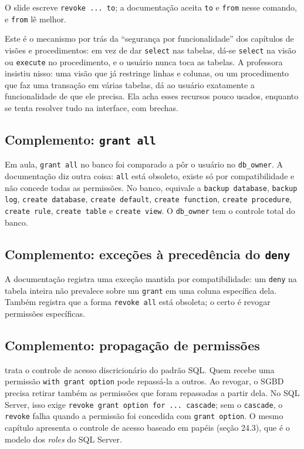 O slide escreve \texttt{revoke ... to}; a documentação aceita
\texttt{to} e \texttt{from} nesse comando, e
\texttt{from} lê melhor.

Este é o mecanismo por trás da ``segurança por funcionalidade'' dos
capítulos de visões e procedimentos: em vez de dar \texttt{select} nas
tabelas, dá-se \texttt{select} na visão ou \texttt{execute} no
procedimento, e o usuário nunca toca as tabelas. A professora insistiu
nisso: uma visão que já restringe linhas e colunas, ou um procedimento
que faz uma transação em várias tabelas, dá ao usuário exatamente a
funcionalidade de que ele precisa. Ela acha esses recursos pouco usados,
enquanto se tenta resolver tudo na interface, com brechas.

\subsection*{Complemento: \texttt{grant all}}

Em aula, \texttt{grant all} no banco foi comparado a pôr o usuário no
\texttt{db\_owner}. A documentação diz outra coisa: \texttt{all} está
obsoleto, existe só por compatibilidade e não concede todas as
permissões. No banco, equivale a \texttt{backup database},
\texttt{backup log}, \texttt{create database}, \texttt{create default},
\texttt{create function}, \texttt{create procedure}, \texttt{create
rule}, \texttt{create table} e \texttt{create view}.
O \texttt{db\_owner} tem o controle total do banco.

\subsection*{Complemento: exceções à precedência do \texttt{deny}}

A documentação registra uma exceção mantida por compatibilidade: um
\texttt{deny} na tabela inteira não prevalece sobre um \texttt{grant} em
uma coluna específica dela. Também registra que a
forma \texttt{revoke all} está obsoleta; o certo é revogar permissões
específicas.

\subsection*{Complemento: propagação de permissões}

\textcite[seção 24.2]{Elmasri2011} trata o controle de acesso
discricionário do padrão SQL. Quem recebe uma permissão \texttt{with
grant option} pode repassá-la a outros. Ao revogar, o SGBD precisa
retirar também as permissões que foram repassadas a partir dela. No SQL
Server, isso exige \texttt{revoke grant option for ... cascade}; sem o
\texttt{cascade}, o \texttt{revoke} falha quando a permissão foi
concedida com \texttt{grant option}. O mesmo capítulo
apresenta o controle de acesso baseado em papéis (seção 24.3), que é o
modelo dos \emph{roles} do SQL Server.

